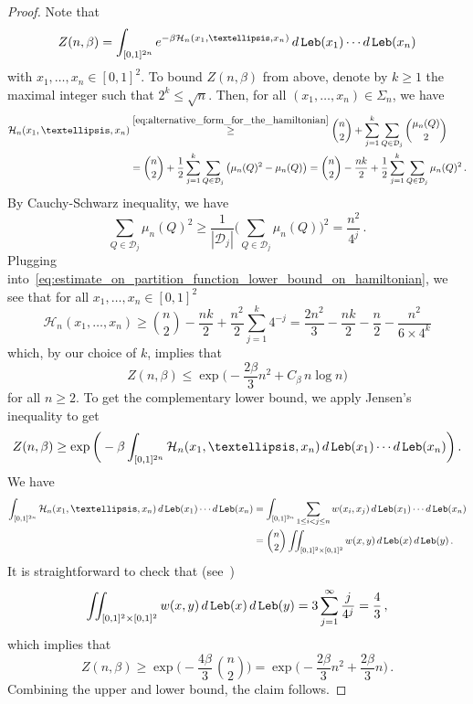 \documentclass[11pt]{amsart}
\theoremstyle{definition}
\theoremstyle{remark}
\numberwithin{equation}{section}
\begin{document}
	\begin{proof}
		Note that
		\[
		Z(n,\beta) = \int_{[0,1]^{2n}} e^{-\beta \mathcal{H}_n(x_1,\ldots,x_n)} \, {\rm d} \, {\tt Leb}(x_1)\cdots {\rm d} \, {\tt Leb}(x_n)
		\]
		with $x_1,\ldots,x_n\in[0,1]^2$. To bound $Z(n,\beta)$ from above, denote by $k\ge 1$ the maximal integer such that $2^k \le \sqrt{n}$. Then, for all $(x_1,\ldots,x_n)\in\Sigma_n$, we have
		\begin{align}
			\label{eq:estimate_on_partition_function_lower_bound_on_hamiltonian} \nonumber
			\mathcal{H}_{n}(x_1,\ldots,x_n) &\stackrel{\eqref{eq:alternative_form_for_the_hamiltonian}}{\ge}  \binom{n}{2} + \sum_{j=1}^{k} \sum_{Q\in \mathcal{D}_j} \binom{\mu_n(Q)}{2} \\ & = \binom{n}{2} +\frac{1}{2} \sum_{j=1}^{k} \sum_{Q\in \mathcal{D}_j} \big(\mu_n(Q)^2 - \mu_{n}(Q)\big) =  \binom{n}{2} -\frac{nk}{2} +\frac{1}{2} \sum_{j=1}^{k} \sum_{Q\in \mathcal{D}_j} \mu_n(Q)^2 \, .  
		\end{align}
		By Cauchy-Schwarz inequality, we have
		\[
		\sum_{Q\in \mathcal{D}_j} \mu_n(Q)^2 \ge \frac{1}{|\mathcal{D}_j|} \bigg(\sum_{Q\in \mathcal{D}_j} \mu_n(Q)\bigg)^2 = \frac{n^2}{4^j} \, .
		\]
		Plugging into~\eqref{eq:estimate_on_partition_function_lower_bound_on_hamiltonian}, we see that for all $x_1,\ldots,x_n\in[0,1]^2$ 
		\[
		\mathcal{H}_n(x_1,\ldots,x_n) \ge \binom{n}{2} -\frac{nk}{2} +\frac{n^2}{2} \sum_{j=1}^{k} 4^{-j} = \frac{2n^2}{3} -\frac{nk}{2} -\frac{n}{2} -\frac{n^2}{6 \times 4^k} 
		\]
		which, by our choice of $k$, implies that
		\begin{equation*}
			Z(n,\beta) \le \exp\Big(-\frac{2\beta}{3}n^2 + C_\beta \, n \log n \Big)
		\end{equation*}
		for all $n\ge 2$. To get the complementary lower bound, we apply Jensen's inequality to get
		\[
		Z(n,\beta) \ge \exp\bigg(-\beta \int_{[0,1]^{2n}} \mathcal{H}_n(x_1,\ldots,x_n) \, {\rm d} \, {\tt Leb}(x_1)\cdots {\rm d} \, {\tt Leb}(x_n)\bigg)\, .
		\]
		We have
		\begin{align*}
			\int_{[0,1]^{2n}}      \mathcal{H}_n(x_1,\ldots,x_n) \, {\rm d} \, {\tt Leb}(x_1)\cdots {\rm d} \, {\tt Leb}(x_n)
			& = \int_{[0,1]^{2n}} \sum_{1\le i <j\le n} w(x_i,x_j) \, {\rm d} \, {\tt Leb}(x_1)\cdots {\rm d} \, {\tt Leb}(x_n) \\
			& = \binom{n}{2} \iint_{[0,1]^2\times[0,1]^2} w(x,y) \, {\rm d} \, {\tt Leb}(x) \, {\rm d} \, {\tt Leb}(y) \, .
		\end{align*}
		It is straightforward to check that (see~\cite[Lemma~3.1]{chatterjee}) 
		\[
		\iint_{[0,1]^2\times[0,1]^2} w(x,y) \, {\rm d} \, {\tt Leb}(x) \, {\rm d} \, {\tt Leb}(y) = 3\sum_{j=1}^{\infty} \frac{j}{4^{j}} = \frac{4}{3}\, ,
		\]
		which implies that
		\[
		Z(n,\beta) \ge \exp\Big(- \frac{4\beta}{3} \, \binom{n}{2}  \Big) = \exp\Big(-\frac{2\beta}{3} n^2 + \frac{2\beta}{3}n\Big)\, .
		\]
		Combining the upper and lower bound, the claim follows.
	\end{proof}
\end{document}
